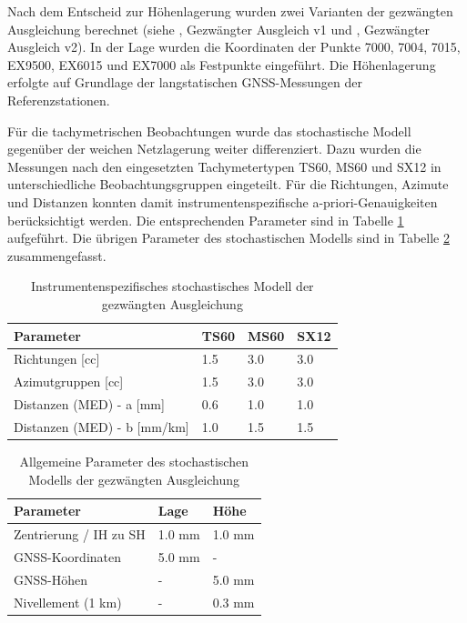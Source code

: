 Nach dem Entscheid zur Höhenlagerung wurden zwei Varianten der gezwängten Ausgleichung berechnet (siehe , Gezwängter Ausgleich v1 und , Gezwängter Ausgleich v2).
In der Lage wurden die Koordinaten der Punkte 7000, 7004, 7015, EX9500, EX6015 und EX7000 als Festpunkte
eingeführt. Die Höhenlagerung erfolgte auf Grundlage der langstatischen GNSS-Messungen der Referenzstationen. \bigskip

Für die tachymetrischen Beobachtungen wurde das stochastische Modell gegenüber der weichen Netzlagerung weiter
differenziert. Dazu wurden die Messungen nach den eingesetzten Tachymetertypen TS60, MS60 und SX12 in
unterschiedliche Beobachtungsgruppen eingeteilt. Für die Richtungen, Azimute und Distanzen konnten damit
instrumentenspezifische a-priori-Genauigkeiten berücksichtigt werden. Die entsprechenden Parameter sind in
Tabelle \ref{tab:stochastisches-modell-instrumente} aufgeführt. Die übrigen Parameter des stochastischen Modells sind in Tabelle \ref{tab:stochastisches-modell-allgemein} zusammengefasst. 

\begin{table}[H]
    \centering
    \begin{tabularx}{\textwidth}{p{5.3cm} X X X}
        \toprule
        Parameter & TS60 & MS60 & SX12 \\
        \midrule
        Richtungen [cc] & 1.5 & 3.0 & 3.0 \\
        \addlinespace
        Azimutgruppen [cc] & 1.5 & 3.0 & 3.0 \\
        \addlinespace
        Distanzen (MED) - a [mm] & 0.6 & 1.0 & 1.0 \\
        \addlinespace
        Distanzen (MED) - b [mm/km] & 1.0 & 1.5 & 1.5 \\
        \bottomrule
    \end{tabularx}
    \caption{Instrumentenspezifisches stochastisches Modell der gezwängten Ausgleichung}
    \label{tab:stochastisches-modell-instrumente}
\end{table}

\begin{table}[H]
    \centering
    \begin{tabularx}{\textwidth}{p{5.5cm} X X}
        \toprule
        Parameter & Lage & Höhe \\
        \midrule
        Zentrierung / IH zu SH & 1.0 mm & 1.0 mm \\
        \addlinespace
        GNSS-Koordinaten & 5.0 mm & - \\
        \addlinespace
        GNSS-Höhen & - & 5.0 mm \\
        \addlinespace
        Nivellement (1 km) & - & 0.3 mm \\
        \bottomrule
    \end{tabularx}
    \caption{Allgemeine Parameter des stochastischen Modells der gezwängten Ausgleichung}
    \label{tab:stochastisches-modell-allgemein}
\end{table}


